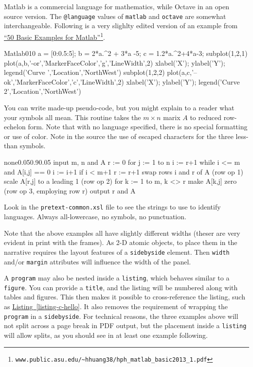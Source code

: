 \documentclass[pdflatex]{sn-jnl}
\theoremstyle{thmstyleone}%
\theoremstyle{thmstyletwo}%
\theoremstyle{thmstylethree}%
\newcommand{\xreffont}{\relax}
\newcommand{\mono}[1]{\texttt{#1}}
\numberwithin{equation}{section}
\begin{document}
Matlab is a commercial language for mathematics, while Octave in an open source version.  The \mono{@language} values of \mono{matlab} and \mono{octave} are somewhat interchangeable.  Following is a very slighlty edited version of an example from \href{http://www.public.asu.edu/\~hhuang38/hph_matlab_basic2013_1.pdf}{``50 Basic Examples for Matlab''}\footnote{\nolinkurl{www.public.asu.edu/\~hhuang38/hph_matlab_basic2013_1.pdf}\label{section-programs-7-5}}.%
\begin{program}{Matlab}{0}{1}{0}
a = [0:0.5:5]; %
b = 2*a.^2 + 3*a -5;
c = 1.2*a.^2+4*a-3;
subplot(1,2,1)
plot(a,b,'-or','MarkerFaceColor','g','LineWidth',2)
xlabel('X'); ylabel('Y'); legend('Curve ','Location','NorthWest')
subplot(1,2,2)
plot(a,c,'--ok','MarkerFaceColor','c','LineWidth',2)
xlabel('X'); ylabel('Y'); legend('Curve 2','Location','NorthWest')
\end{program}
You can write made-up pseudo-code, but you might explain to a reader what your symbols all mean.  This routine takes the \(m\times n\) marix \(A\) to reduced row-echelon form.  Note that with no language specified, there is no special formatting or use of color.  Note in the source the use of escaped characters for the three less-than symbols.%
\begin{program}{none}{0.05}{0.9}{0.05}
input m, n and A
r := 0
for j := 1 to n
   i := r+1
   while i <= m and A[i,j] == 0
       i := i+1
   if i < m+1
       r := r+1
       swap rows i and r of A (row op 1)
       scale A[r,j] to a leading 1 (row op 2)
       for k := 1 to m, k <> r
           make A[k,j] zero (row op 3, employing row r)
output r and A
\end{program}
Look in the \mono{pretext-common.xsl} file to see the strings to use to identify languages.  Always all-lowercase, no symbols, no punctuation.%
\par
Note that the above examples all have slightly different widths (theser are very evident in print with the frames).  As 2-D atomic objects, to place them in the narrative requires the layout features of a \mono{sidebyside} element.  Then \mono{width} and\slash{}or \mono{margin} attributes will influence the width of the panel.%
\par
A \mono{program} may also be nested inside a \mono{listing}, which behaves similar to a \mono{figure}.  You can provide a \mono{title}, and the listing will be numbered along with tables and figures.  This then makes it possible to cross-reference the listing, such as \hyperref[listing-c-hello]{Listing~{\xreffont\ref{listing-c-hello}}}.  It also removes the requirement of wrapping the \mono{program} in a \mono{sidebyside}.  For technical reasons, the three examples above will not split across a page break in PDF output, but the placement inside a \mono{listing} will allow splits, as you should see in at least one example following.%
\end{document}
